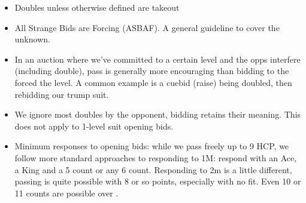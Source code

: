 \documentclass[tom-ari]{subfile}
\begin{document}
\begin{itemize}
	\item Doubles unless otherwise defined are takeout
	\item All Strange Bids are Forcing (ASBAF).  A general guideline to cover the unknown.
	\item In an auction where we've committed to a certain level and the opps interfere (including double), pass is generally more encouraging than bidding to the forced the level.  A common example is a cuebid (raise) being doubled, then rebidding our trump suit.
	\item We ignore most doubles by the opponent, bidding retains their meaning.  This does not apply to 1-level suit opening bids.
	\item Minimum responses to opening bids: while we pass  freely up to 9 HCP, we follow more standard approaches to responding to 1M: respond with an Ace, a King and a 5 count or any 6 count.  Responding to 2m is a little different, passing is quite possible with 8 or so points, especially with no fit.  Even 10 or 11 counts are possible over .
\end{itemize}	
\end{document}
